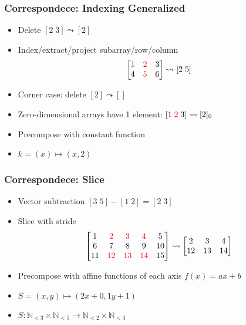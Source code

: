 \documentclass[xetex,mathserif,serif]{beamer}
\newcommand\Nat{\mathbb{N}}
\newcommand\NB[1]{\textcolor{red}{#1}}
\begin{document}
\begin{frame}
  \frametitle{Correspondece: Indexing Generalized}
  \pause
  \begin{itemize}[<+->]
    \item Delete \([2\;3] \leadsto [2]\)
    \item Index/extract/project subarray/row/column
      \[
        \begin{bmatrix}
          1 & \NB 2 & 3 \\ 4 & \NB 5 & 6
        \end{bmatrix} \leadsto
        [2\;5]
      \]
    \item Corner case: delete \([2] \leadsto []\)
    \item Zero-dimensional arrays have 1 element: \([1\;\NB 2\;3] \leadsto [2]_0\)
    \item Precompose with constant function
    \item \(k = (x)\mapsto (x, 2)\)
  \end{itemize}
\end{frame}

\begin{frame}
  \frametitle{Correspondece: Slice}
  \pause
  \begin{itemize}[<+->]
    \item Vector subtraction \( [3\;5] - [1\;2] = [2\;3] \)
    \item Slice with stride
      \[
        \begin{bmatrix}
          1 & \NB 2 & \NB 3 & \NB 4 & 5 \\
          6 & 7 & 8 &  9 & 10 \\
          11 & \NB{12} & \NB{13} & \NB{14} & 15
        \end{bmatrix} \leadsto \begin{bmatrix}
          2 & 3 & 4 \\
          12 & 13 & 14
        \end{bmatrix}
      \]
    \item Precompose with affine functions of each axis \(f(x) = ax + b\)
    \item \(S = (x, y) \mapsto (2x + 0, 1y + 1)\)
    \item \(S : \Nat_{<3}\times\Nat_{<5} \to \Nat_{<2}\times\Nat_{<3}\)
  \end{itemize}
\end{frame}
\end{document}
